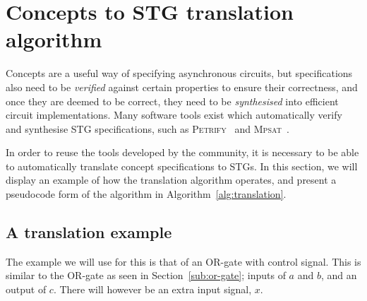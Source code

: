 \documentclass[british,conference,compsoc]{IEEEtran}
\newcommand{\noun}[1]{\textsc{#1}}
\begin{document}
%

\section{Concepts to STG translation algorithm\label{sec:algorithm}}

Concepts are a useful way of specifying asynchronous circuits, but
specifications also need to be \emph{verified} against certain properties to
ensure their correctness, and once they are deemed to be correct, they need to
be \emph{synthesised} into efficient circuit implementations. Many software
tools exist which automatically verify and synthesise STG specifications,
such as \noun{Petrify}~\cite{Cortadella} and
\noun{Mpsat}~\cite{khomenko2004detecting}.

In order to reuse the tools developed by the community, it is
necessary to be able to automatically translate concept specifications to STGs.
In this section, we will display an example of how the translation algorithm 
operates, and present a pseudocode form of the algorithm in Algorithm~\ref{alg:translation}. 


\subsection{A translation example}

The example we will use for this is that of an OR-gate with control signal. 
This is similar to the OR-gate as seen in Section~\ref{sub:or-gate}; inputs
of $a$ and $b$, and an output of $c$. There will however be an extra 
input signal, $x$. 
\end{document}
